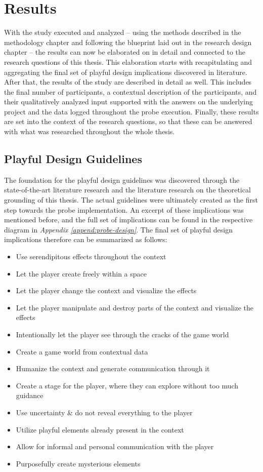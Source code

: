 \section{Results}

With the study executed and analyzed -- using the methods described in the methodology chapter and following the blueprint laid out in the research design chapter -- the results can now be elaborated on in detail and connected to the research questions of this thesis. This elaboration starts with recapitulating and aggregating the final set of playful design implications discovered in literature. After that, the results of the study are described in detail as well. This includes the final number of participants, a contextual description of the participants, and their qualitatively analyzed input supported with the answers on the underlying project and the data logged throughout the probe execution. Finally, these results are set into the context of the research questions, so that these can be answered with what was researched throughout the whole thesis.

\subsection{Playful Design Guidelines}

The foundation for the playful design guidelines was discovered through the state-of-the-art literature research and the literature research on the theoretical grounding of this thesis. The actual guidelines were ultimately created as the first step towards the probe implementation. An excerpt of these implications was mentioned before, and the full set of implications can be found in the respective diagram in \textit{Appendix \ref{append:probe-design}}. The final set of playful design implications therefore can be summarized as follows:

\begin{itemize}
  \item{Use serendipitous effects throughout the context}
  \item{Let the player create freely within a space}
  \item{Let the player change the context and visualize the effects}
  \item{Let the player manipulate and destroy parts of the context and visualize the effects}
  \item{Intentionally let the player see through the cracks of the game world}
  \item{Create a game world from contextual data}
  \item{Humanize the context and generate communication through it}
  \item{Create a stage for the player, where they can explore without too much guidance}
  \item{Use uncertainty \& do not reveal everything to the player}
  \item{Utilize playful elements already present in the context}
  \item{Allow for informal and personal communication with the player}
  \item{Purposefully create mysterious elements}
\end{itemize}

